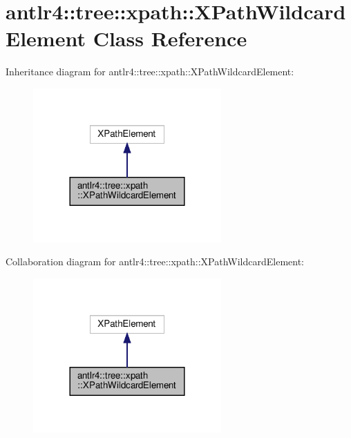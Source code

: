 \hypertarget{classantlr4_1_1tree_1_1xpath_1_1XPathWildcardElement}{}\section{antlr4\+:\+:tree\+:\+:xpath\+:\+:X\+Path\+Wildcard\+Element Class Reference}
\label{classantlr4_1_1tree_1_1xpath_1_1XPathWildcardElement}


Inheritance diagram for antlr4\+:\+:tree\+:\+:xpath\+:\+:X\+Path\+Wildcard\+Element\+:
\nopagebreak
\begin{figure}[H]
\begin{center}
\leavevmode
\includegraphics[width=204pt]{classantlr4_1_1tree_1_1xpath_1_1XPathWildcardElement__inherit__graph}
\end{center}
\end{figure}


Collaboration diagram for antlr4\+:\+:tree\+:\+:xpath\+:\+:X\+Path\+Wildcard\+Element\+:
\nopagebreak
\begin{figure}[H]
\begin{center}
\leavevmode
\includegraphics[width=204pt]{classantlr4_1_1tree_1_1xpath_1_1XPathWildcardElement__coll__graph}
\end{center}
\end{figure}
